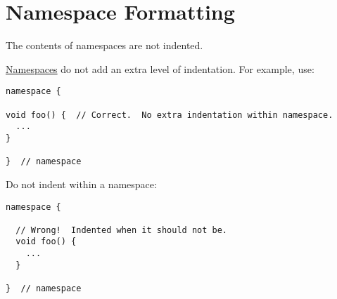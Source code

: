 
\section{Namespace Formatting}\label{sec:namespace-formatting}
The contents of namespaces are not indented.

\hyperref[sec:namespaces]{Namespaces} do not add an extra level of indentation. For example, use:
\begin{verbatim}
namespace {

void foo() {  // Correct.  No extra indentation within namespace.
  ...
}

}  // namespace
\end{verbatim}
Do not indent within a namespace:
\begin{verbatim}
namespace {

  // Wrong!  Indented when it should not be.
  void foo() {
    ...
  }

}  // namespace
\end{verbatim}
